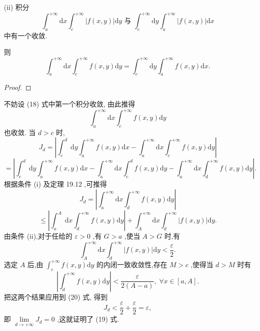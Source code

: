 (ii) 积分
\[
{\int }_{a}^{+\infty }\mathrm{d}x{\int }_{c}^{+\infty }\left| {f\left( {x,y}\right) }\right| \mathrm{d}y\text{ 与 }{\int }_{c}^{+\infty }\mathrm{d}y{\int }_{a}^{+\infty }\left| {f\left( {x,y}\right) }\right| \mathrm{d}x \tag{18}
\]
中有一个收敛.

则
\[
{\int }_{a}^{+\infty }\mathrm{d}x{\int }_{c}^{+\infty }f\left( {x,y}\right) \mathrm{d}y = {\int }_{c}^{+\infty }\mathrm{d}y{\int }_{a}^{+\infty }f\left( {x,y}\right) \mathrm{d}x. \tag{19}
\]
\begin{proof}

\end{proof}
不妨设 (18) 式中第一个积分收敛, 由此推得
\[
{\int }_{a}^{+\infty }\mathrm{d}x{\int }_{c}^{+\infty }f\left( {x,y}\right) \mathrm{d}y
\]
也收敛. 当 \(d > c\) 时,
\[
{J}_{d} = \left| {{\int }_{c}^{d}\mathrm{\;d}y{\int }_{a}^{+\infty }f\left( {x,y}\right) \mathrm{d}x - {\int }_{a}^{+\infty }\mathrm{d}x{\int }_{c}^{+\infty }f\left( {x,y}\right) \mathrm{d}y}\right|
\]
\[
= \left| {{\int }_{c}^{d}\mathrm{\;d}y{\int }_{a}^{+\infty }f\left( {x,y}\right) \mathrm{d}x - {\int }_{a}^{+\infty }\mathrm{d}x{\int }_{c}^{d}f\left( {x,y}\right) \mathrm{d}y - {\int }_{a}^{+\infty }\mathrm{d}x{\int }_{d}^{+\infty }f\left( {x,y}\right) \mathrm{d}y}\right| .
\]
根据条件 (i) 及定理 19.12 ,可推得
\[
{J}_{d} = \left| {{\int }_{a}^{+\infty }\mathrm{d}x{\int }_{d}^{+\infty }f\left( {x,y}\right) \mathrm{d}y}\right|
\]
\[
\leq  \left| {{\int }_{a}^{A}\mathrm{\;d}x{\int }_{d}^{+\infty }f\left( {x,y}\right) \mathrm{d}y}\right|  + {\int }_{A}^{+\infty }\mathrm{d}x{\int }_{d}^{+\infty }\left| {f\left( {x,y}\right) }\right| \mathrm{d}y. \tag{20}
\]
由条件 (ii),对于任给的 \(\varepsilon  > 0\) ,有 \(G > a\) ,使当 \(A > G\) 时,有
\[
{\int }_{A}^{+\infty }\mathrm{d}x{\int }_{d}^{+\infty }\left| {f\left( {x,y}\right) }\right| \mathrm{d}y < \frac{\varepsilon }{2}.
\]
选定 \(A\) 后,由 \({\int }_{c}^{+\infty }f\left( {x,y}\right) \mathrm{d}y\) 的内闭一致收敛性,存在 \(M > c\) ,使得当 \(d > M\) 时有
\[
\left| {{\int }_{d}^{+\infty }f\left( {x,y}\right) \mathrm{d}y}\right|  < \frac{\varepsilon }{2\left( {A - a}\right) },\;\forall x \in  \left\lbrack  {a,A}\right\rbrack  .
\]
把这两个结果应用到 (20) 式, 得到
\[
{J}_{d} < \frac{\varepsilon }{2} + \frac{\varepsilon }{2} = \varepsilon ,
\]
即 \(\mathop{\lim }\limits_{{d \rightarrow   + \infty }}{J}_{d} = 0\) ,这就证明了 (19) 式.

